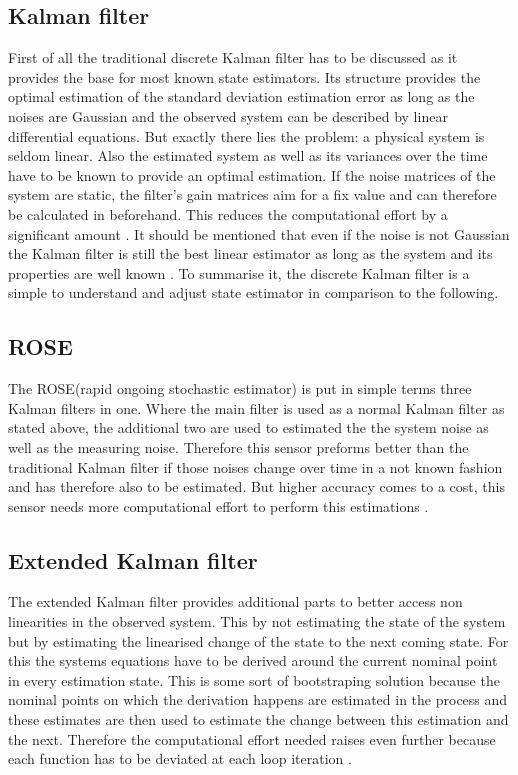   \subsection{Kalman filter}
  First of all the traditional discrete Kalman filter has to be discussed as it provides the base for most known state estimators.
  Its structure provides the optimal estimation of the standard deviation estimation error as long as the noises are Gaussian
  and the observed system can be described by linear differential equations.
  But exactly there lies the problem: a physical system is seldom linear.
  Also the estimated system as well as its variances over the time have to be known to provide an optimal estimation.
  If the noise matrices of the system are static, the filter's gain matrices aim for a fix value and can therefore be calculated in beforehand.
  This reduces the computational effort by a significant amount \cite{DavidWSchultz2004}.
  It should be mentioned that even if the noise is not Gaussian the Kalman filter is still the best
  linear estimator as long as the system and its properties are well known \cite{SimonDan2006Ose:}.
  To summarise it, the discrete Kalman filter is a simple to understand and adjust state estimator in comparison to the following.

  \subsection{ROSE}
  The ROSE(rapid ongoing stochastic estimator) is put in simple terms three Kalman filters in one.
  Where the main filter is used as a normal Kalman filter as stated above, the additional two are used to estimated the
  the system noise as well as the measuring noise. Therefore this sensor preforms better than the traditional Kalman filter
  if those noises change over time in a not known fashion and has therefore also to be estimated.
  But higher accuracy comes to a cost, this sensor needs more computational effort to perform this estimations \cite{DavidWSchultz2004}.

  \subsection{Extended Kalman filter}
  The extended Kalman filter provides additional parts to better access non linearities in the observed system.
  This by not estimating the state of the system but by estimating the linearised change of the state
  to the next coming state. For this the systems equations have to be derived around the current nominal point in every estimation state.
  This is some sort of bootstraping solution because the nominal points on which the derivation happens are estimated in the process and
  these estimates are then used to estimate the change between this estimation and the next.
  Therefore the computational effort needed raises even further because each function has to be deviated at each loop iteration \cite{SimonDan2006Ose:}.

